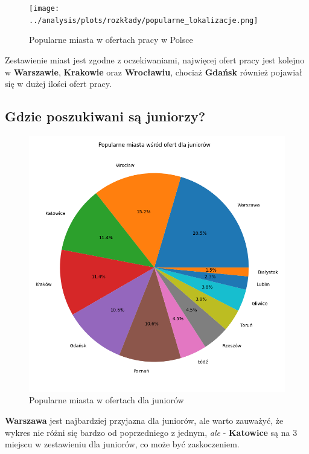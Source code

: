 \documentclass[a4paper]{article}
\begin{document}
\begin{figure}[H]
    \centering
    \texttt{[image: ../analysis/plots/rozkłady/popularne\_lokalizacje.png]}
    \caption{Popularne miasta w ofertach pracy w Polsce}
\end{figure}

\quad Zestawienie miast jest zgodne z oczekiwaniami, najwięcej ofert pracy jest kolejno w \textbf{Warszawie}, \textbf{Krakowie} oraz \textbf{Wrocławiu}, chociaż
\textbf{Gdańsk} również pojawiał się w dużej ilości ofert pracy.


\subsection{Gdzie poszukiwani są juniorzy?}

\begin{figure}[H]
    \centering
    \includegraphics[width=\textwidth]{../analysis/plots/rozkłady/popularne_miasta_wśród_ofert_dla_juniorów.png}
    \caption{Popularne miasta w ofertach dla juniorów}
\end{figure}

\quad \textbf{Warszawa} jest najbardziej przyjazna dla juniorów, ale
warto zauważyć, że wykres nie różni się bardzo od poprzedniego z jednym, \textit{ale} - \textbf{Katowice} są
na 3 miejscu w zestawieniu dla juniorów, co może być zaskoczeniem.
\end{document}
